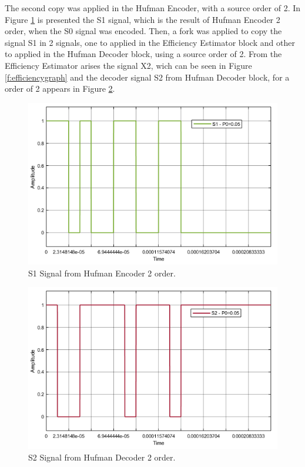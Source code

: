 \begin{refsection}
The second copy was applied in the Hufman Encoder, with a source order of 2. In Figure \ref{f:S1} is presented the S1 signal, which is the result of Hufman Encoder 2 order, when the S0 signal was encoded.
Then, a fork was applied to copy the signal S1 in 2 signals, one to applied in the Efficiency Estimator block and other to applied in the Hufman Decoder block, using a source order of 2.
From the Efficiency Estimator arises the signal X2, wich can be seen in Figure \ref{f:efficiencygraph} and the decoder signal S2 from Hufman Decoder block, for a order of 2 appears in Figure \ref{f:S2}. 
\begin{figure}[!h]
\centering
\includegraphics[width=5in]{./sdf/eit_45550_estimator_source_code_efficiency/figures/S1.png}
\caption[S1 Signal from Hufman Encoder 2 order.]{S1 Signal from Hufman Encoder 2 order.}
\label{f:S1}
\end{figure}


\begin{figure}[!h]
\centering
\includegraphics[width=5in]{./sdf/eit_45550_estimator_source_code_efficiency/figures/S2.png}
\caption[S2 Signal from Hufman Decoder 2 order.]{S2 Signal from Hufman Decoder 2 order.}
\label{f:S2}
\end{figure}


\end{refsection}
